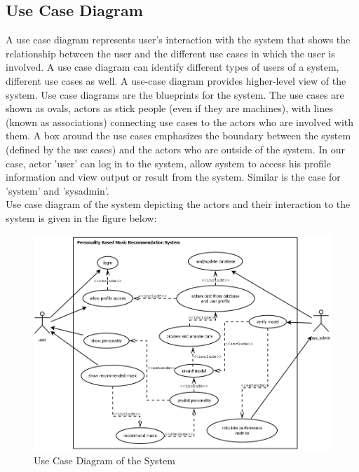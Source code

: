 \subsection{Use Case Diagram}
A use case diagram represents user's interaction with the system that shows the relationship between the user and the different use cases in which the user is involved. A use case diagram can identify different types of users of a system, different use cases as well. A use-case diagram provides higher-level view of the system. Use case diagrams are the blueprints for the system. The use cases are shown as ovals, actors as stick people (even if they are machines), with lines (known as associations) connecting use cases to the actors who are involved with them. A box around the use cases emphasizes the boundary between the system (defined by the use cases) and the actors who are outside of the system. In our case, actor 'user' can log in to the system, allow system to access his profile information and view output or result from the system. Similar is the case for 'system' and 'sysadmin'. 
\\
Use case diagram of the system depicting the actors and their interaction to the system is given in the figure below:
\begin{figure}[!ht]
\centering
\includegraphics[width = 16 cm]{fig/new/usecase.png}
\caption{Use Case Diagram of the System}
\label{fig:usecase}
\end{figure}

